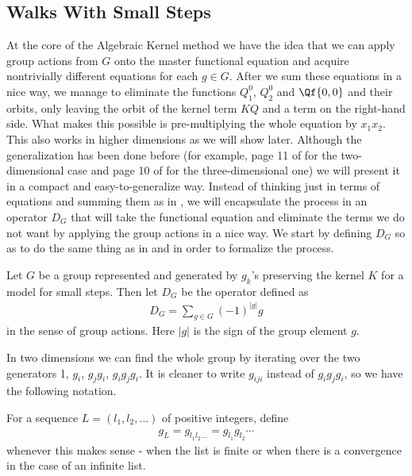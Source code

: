 \subsection{Walks With Small Steps}
At the core of the Algebraic Kernel method we have the idea that we can apply group actions from $G$ onto the master functional equation and acquire nontrivially different equations for each $g\in  G$. After we sum these equations in a nice way, we manage to eliminate the functions $Q_1^0$, $Q_2^0$ and $\Qf{0,0}$ and their orbits, only leaving the orbit of the kernel term $KQ$ and a term on the right-hand side. What makes this possible is pre-multiplying the whole equation by $x_1 x_2$. This also works in higher dimensions as we will show later. Although the generalization has been done before (for example, page 11 of \cite{bousquet2010walks} for the two-dimensional case and page 10 of \cite{bostan2014three} for the three-dimensional one) we will present it in a compact and easy-to-generalize way. Instead of thinking just in terms of equations and summing them as in \cite{bousquet2010walks}, we will encapsulate the process in an operator $D_G$ that will take the functional equation and eliminate the terms we do not want by applying the group actions in a nice way. We start by defining $D_G$ so as to do the same thing as in \cite{bousquet2010walks} and \cite{bostan2014three} in order to formalize the process.
\begin{definition} Let $G$ be a group represented and generated by $g_k$'s preserving the kernel $K$ for a model for small steps. Then let $D_G$ be the operator defined as
\begin{align}
	D_G = \sum_{g\in G} (-1)^{|g|}g
\end{align}
in the sense of group actions. Here $|g|$ is the sign of the group element $g$.
\end{definition}
In two dimensions we can find the whole group by iterating over the two generators 1, $g_i$, $g_jg_i$, $g_ig_jg_i$. It is cleaner to write $g_{iji}$ instead of $g_ig_jg_i$, so we have the following notation.
\begin{definition} For a sequence $L = (l_1,l_2,\ldots)$ of positive integers, define 
\begin{align}
	g_L = g_{l_1l_2\ldots} = g_{l_1}g_{l_2}\cdots
\end{align} 
whenever this makes sense - when the list is finite or when there is a convergence in the case of an infinite list.
\end{definition}
